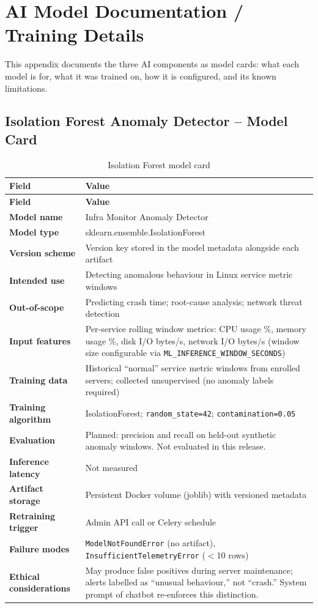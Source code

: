 \chapter{AI Model Documentation / Training Details}

This appendix documents the three AI components as model cards: what each
model is for, what it was trained on, how it is configured, and its known
limitations.

\section{Isolation Forest Anomaly Detector -- Model Card}

{\small
\begin{longtable}{@{}l >{\raggedright\arraybackslash}p{11.2cm}@{}}
\caption{Isolation Forest model card}\label{tab:isoforest_card}\\
\toprule
\textbf{Field} & \textbf{Value}\\
\midrule
\endfirsthead
\toprule
\textbf{Field} & \textbf{Value}\\
\midrule
\endhead
\bottomrule
\endlastfoot
\textbf{Model name} & Infra Monitor Anomaly Detector\\
\textbf{Model type} & sklearn.ensemble.IsolationForest\\
\textbf{Version scheme} & Version key stored in the model metadata alongside each artifact\\
\textbf{Intended use} & Detecting anomalous behaviour in Linux service metric windows\\
\textbf{Out-of-scope} & Predicting crash time; root-cause analysis; network threat detection\\
\textbf{Input features} & Per-service rolling window metrics: CPU usage \%, memory usage \%,
  disk I/O bytes/s, network I/O bytes/s (window size configurable via
  \texttt{ML\_INFERENCE\_WINDOW\_SECONDS})\\
\textbf{Training data} & Historical ``normal'' service metric windows from enrolled servers;
  collected unsupervised (no anomaly labels required)\\
\textbf{Training algorithm} & IsolationForest; \texttt{random\_state=42};
  \texttt{contamination=0.05}\\
\textbf{Evaluation} & Planned: precision and recall on held-out synthetic
  anomaly windows.  Not evaluated in this release.\\
\textbf{Inference latency} & Not measured\\
\textbf{Artifact storage} & Persistent Docker volume (joblib) with versioned metadata\\
\textbf{Retraining trigger} & Admin API call or Celery schedule\\
\textbf{Failure modes} & \texttt{ModelNotFoundError} (no artifact), \texttt{InsufficientTelemetryError} ($<$10 rows)\\
\textbf{Ethical considerations} & May produce false positives during server maintenance;
  alerts labelled as ``unusual behaviour,'' not ``crash.'' System prompt of
  chatbot re-enforces this distinction.\\
\end{longtable}
}

